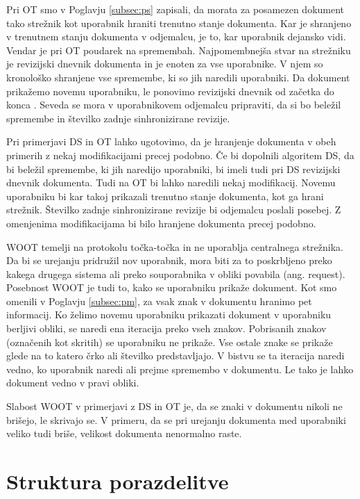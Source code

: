 \documentclass[a4paper, 12pt, twoside]{book}
\begin{document}
Pri OT smo v Poglavju \ref{subsec:ps} zapisali, da morata za posamezen dokument tako strežnik kot uporabnik hraniti trenutno stanje dokumenta. Kar je shranjeno v trenutnem stanju dokumenta v odjemalcu, je to, kar uporabnik dejansko vidi. Vendar je pri OT poudarek na spremembah. Najpomembnejša stvar na strežniku je revizijski dnevnik dokumenta in je enoten za vse uporabnike. V njem so kronološko shranjene vse spremembe, ki so jih naredili uporabniki. Da dokument prikažemo novemu uporabniku, le ponovimo revizijski dnevnik od začetka do konca \cite{gdocs22}. Seveda se mora v uporabnikovem odjemalcu pripraviti, da si bo beležil spremembe in številko zadnje sinhronizirane revizije.

Pri primerjavi DS in OT lahko ugotovimo, da je hranjenje dokumenta v obeh primerih z nekaj modifikacijami precej podobno. Če bi dopolnili algoritem DS, da bi beležil spremembe, ki jih naredijo uporabniki, bi imeli tudi pri DS revizijski dnevnik dokumenta. Tudi na OT bi lahko naredili nekaj modifikacij. Novemu uporabniku bi kar takoj prikazali trenutno stanje dokumenta, kot ga hrani strežnik. Številko zadnje sinhronizirane revizije bi odjemalcu poslali posebej. Z omenjenima modifikacijama bi bilo hranjene dokumenta precej podobno.

WOOT temelji na protokolu točka-točka in ne uporablja centralnega strežnika. Da bi se urejanju pridružil nov uporabnik, mora biti za to poskrbljeno preko kakega drugega sistema ali preko souporabnika v obliki povabila (ang. request). Posebnost WOOT je tudi to, kako se uporabniku prikaže dokument. Kot smo omenili v Poglavju \ref{subsec:pm}, za vsak znak v dokumentu hranimo pet informacij. Ko želimo novemu uporabniku prikazati dokument v uporabniku berljivi obliki, se naredi ena iteracija preko vseh znakov. Pobrisanih znakov (označenih kot skritih) se uporabniku ne prikaže. Vse ostale znake se prikaže glede na to katero črko ali številko predstavljajo. V bistvu se ta iteracija naredi vedno, ko uporabnik naredi ali prejme spremembo v dokumentu. Le tako je lahko dokument vedno v pravi obliki.

Slabost WOOT v primerjavi z DS in OT je, da se znaki v dokumentu nikoli ne brišejo, le skrivajo se. V primeru, da se pri urejanju dokumenta med uporabniki veliko tudi briše, velikost dokumenta nenormalno raste.

\section{Struktura porazdelitve}
\end{document}
